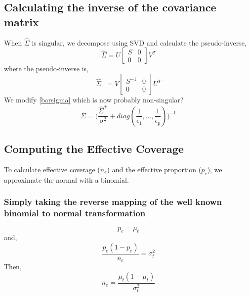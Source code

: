 \documentclass[10pt,a4paper,draft]{article}
\begin{document}
\subsection{Calculating the inverse of the covariance matrix}
When $\hat{\Sigma}$ is singular, we decompose using SVD and calculate the pseudo-inverse,
\begin{equation}
\hat{\Sigma} = U 
\begin{bmatrix} S & 0 \\ 0 & 0 \end{bmatrix} V^T
\end{equation}
where the pseudo-inverse is,
\begin{equation}
\hat{\Sigma}^{+} = V \begin{bmatrix} S^{-1} & 0 \\ 0 & 0 \end{bmatrix} U^T
\end{equation}
We modify \ref{barsigma} which is now probably non-singular?
\begin{equation}
\bar{\Sigma} =  \big(\frac{\hat{\Sigma}^{+}}{\sigma^2} + diag(\frac{1}{\epsilon_1},..., \frac{1}{\epsilon_p})\big)^{-1}
\end{equation}

\subsection{Computing the Effective Coverage}
To calculate effective coverage ($n_e$) and the effective proportion
($p_e$), we approximate the normal with a binomial.

\subsubsection{Simply taking the reverse mapping of the well known
  binomial to normal transformation}
\begin{equation} 
p_e = \mu_t
\end{equation}
and,
\begin{equation}
\frac{p_e(1-p_e)}{n_e}= \sigma_t^2
\end{equation}
Then,
\begin{equation}
n_e = \frac{\mu_t(1-\mu_t)}{\sigma_t^2}
\end{equation}
\end{document}
